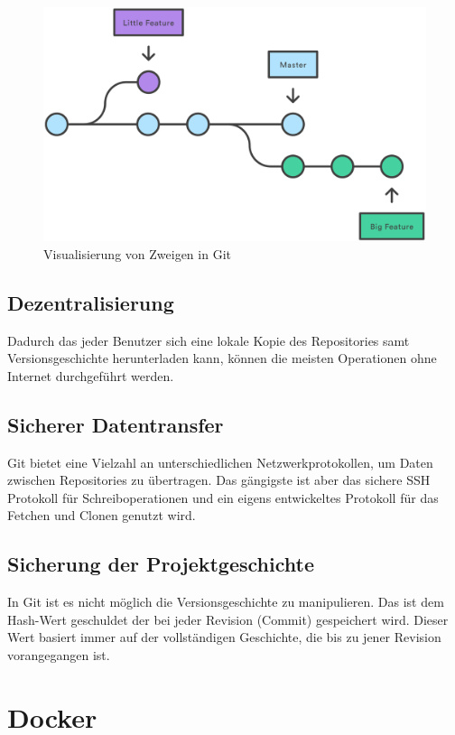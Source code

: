 \begin{figure}[!h]
	\begin{center}
		\includegraphics[width=0.9\linewidth]{images/Git-Branches-1.png}
		\caption{Visualisierung von Zweigen in Git ~\cite{GitBranches}}
	\end{center}
\end{figure}

\subsection*{Dezentralisierung}
Dadurch das jeder Benutzer sich eine lokale Kopie des Repositories samt Versionsgeschichte herunterladen kann, können die meisten Operationen ohne Internet durchgeführt werden. 

\subsection*{Sicherer Datentransfer}
Git bietet eine Vielzahl an unterschiedlichen Netzwerkprotokollen, um Daten zwischen Repositories zu übertragen. Das gängigste ist aber das sichere SSH Protokoll für Schreiboperationen und ein eigens entwickeltes Protokoll für das Fetchen und Clonen genutzt wird.

\subsection*{Sicherung der Projektgeschichte}
In Git ist es nicht möglich die Versionsgeschichte zu manipulieren. Das ist dem Hash-Wert geschuldet der bei jeder Revision (Commit) gespeichert wird. Dieser Wert basiert immer auf der vollständigen Geschichte, die bis zu jener Revision vorangegangen ist. 


\newpage
\clearpage
\section{Docker}\label{sec:Docker}
\small{\cite{docker_wiki}}{\cite{docker_glossary}}
